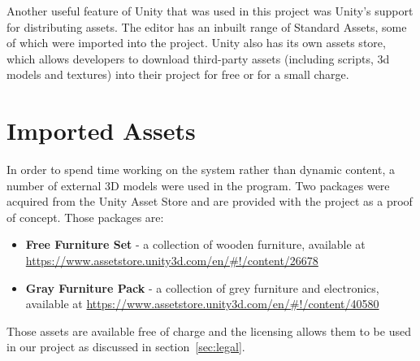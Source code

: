 Another useful feature of Unity that was used in this project was Unity's support for distributing assets. The editor has an inbuilt range of Standard Assets, some of which were imported into the project. Unity also has its own assets store, which allows developers to download third-party assets (including scripts, 3d models and textures) into their project for free or for a small charge.


\section{Imported Assets}
In order to spend time working on the system rather than dynamic content, a number of external 3D models were used in the program. Two packages were acquired from the Unity Asset Store and are provided with the project as a proof of concept. Those packages are:
\begin{itemize}
    \item \textbf{Free Furniture Set} - a collection of wooden furniture, available at\\ \url{https://www.assetstore.unity3d.com/en/#!/content/26678}
    \item \textbf{Gray Furniture Pack} - a collection of grey furniture and electronics, available at \url{https://www.assetstore.unity3d.com/en/#!/content/40580} 
\end{itemize}

Those assets are available free of charge and the licensing allows them to be used in our project as discussed in section~\ref{sec:legal}.